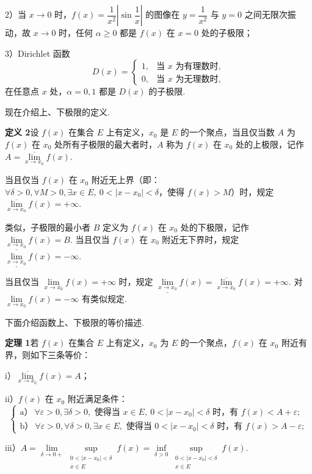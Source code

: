 \documentclass[UTF8, 12pt, fontset=fandol, oneside]{ctexart}
\begin{document}
2）当 $x\to0$ 时，$f(x)=\dfrac1{x^2}\left|\sin\dfrac1x\right|$ 的图像在 $y=\dfrac1{x^2}$ 与 $y=0$ 之间无限次振动，故 $x\to0$ 时，任何 $\alpha\ge0$ 都是 $f(x)$ 在 $x=0$ 处的子极限；

3）Dirichlet 函数
\[
  D(x)=
  \begin{cases}
    1, & \text{当 }x\text{ 为有理数时},\\
    0, & \text{当 }x\text{ 为无理数时},
  \end{cases}
\]
在任意点 $x$ 处，$\alpha=0,1$ 都是 $D(x)$ 的子极限.

现在介绍上、下极限的定义.

\noindent\textbf{定义 2}\quad 设 $f(x)$ 在集合 $E$ 上有定义，$x_0$ 是 $E$ 的一个聚点，当且仅当数 $A$ 为 $f(x)$ 在 $x_0$ 处所有子极限的最大者时，$A$ 称为 $f(x)$ 在 $x_0$ 处的上极限，记作 $A=\overline{\lim\limits_{x\to x_0}}f(x)$.

当且仅当 $f(x)$ 在 $x_0$ 附近无上界（即：$\forall \delta>0,\forall M>0,\exists x\in E,\ 0<|x-x_0|<\delta$，使得 $f(x)>M$）时，规定 $\overline{\lim\limits_{x\to x_0}}f(x)=+\infty$.

类似，子极限的最小者 $B$ 定义为 $f(x)$ 在 $x_0$ 处的下极限，记作 $\underline{\lim\limits_{x\to x_0}}f(x)=B$. 当且仅当 $f(x)$ 在 $x_0$ 附近无下界时，规定 $\underline{\lim\limits_{x\to x_0}}f(x)=-\infty$.

当且仅当 $\lim\limits_{x\to x_0}f(x)=+\infty$ 时，规定 $\underline{\lim\limits_{x\to x_0}}f(x)=\overline{\lim\limits_{x\to x_0}}f(x)=+\infty$. 对 $\lim\limits_{x\to x_0}f(x)=-\infty$ 有类似规定.

下面介绍函数上、下极限的等价描述.

\noindent\textbf{定理 1}\quad 若 $f(x)$ 在集合 $E$ 上有定义，$x_0$ 为 $E$ 的一个聚点，$f(x)$ 在 $x_0$ 附近有界，则如下三条等价：

i）$\overline{\lim\limits_{x\to x_0}}f(x)=A$；

ii）$f(x)$ 在 $x_0$ 附近满足条件：
\[
\begin{cases}
\text{a）}\ \forall \varepsilon>0,\exists\delta>0,\text{ 使得当 }x\in E,\ 0<|x-x_0|<\delta\text{ 时，有 }f(x)<A+\varepsilon;\\
\text{b）}\ \forall \varepsilon>0,\forall\delta>0,\exists x\in E,\text{ 使得当 }0<|x-x_0|<\delta\text{ 时，有 }f(x)>A-\varepsilon;
\end{cases}
\]

iii）$A=\lim\limits_{\delta\to0+}\sup\limits_{\substack{0<|x-x_0|<\delta\\ x\in E}}f(x)
=\inf\limits_{\delta>0}\sup\limits_{\substack{0<|x-x_0|<\delta\\ x\in E}}f(x)$.
\end{document}
